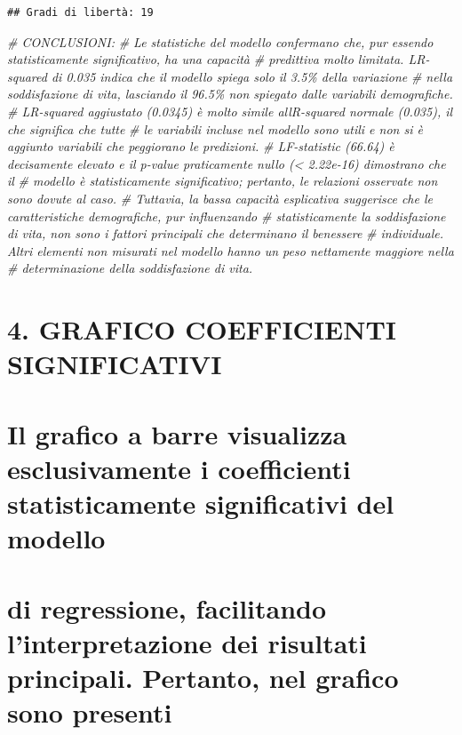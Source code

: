 \documentclass[
]{article}
\newenvironment{Shaded}{\begin{snugshade}}{\end{snugshade}}
\newcommand{\CommentTok}[1]{\textcolor[rgb]{0.56,0.35,0.01}{\textit{#1}}}
\begin{document}
\begin{verbatim}
## Gradi di libertà: 19
\end{verbatim}

\begin{Shaded}
\begin{Highlighting}[]
\CommentTok{\# CONCLUSIONI:}
\CommentTok{\# Le statistiche del modello confermano che, pur essendo statisticamente significativo, ha una capacità}
\CommentTok{\# predittiva molto limitata. L\textquotesingle{}R{-}squared di 0.035 indica che il modello spiega solo il 3.5\% della variazione}
\CommentTok{\# nella soddisfazione di vita, lasciando il 96.5\% non spiegato dalle variabili demografiche.}
\CommentTok{\# L\textquotesingle{}R{-}squared aggiustato (0.0345) è molto simile all\textquotesingle{}R{-}squared normale (0.035), il che significa che tutte }
\CommentTok{\# le variabili incluse nel modello sono utili e non si è aggiunto variabili che peggiorano le predizioni.}
\CommentTok{\# L\textquotesingle{}F{-}statistic (66.64) è decisamente elevato e il p{-}value praticamente nullo (\textless{} 2.22e{-}16) dimostrano che il}
\CommentTok{\# modello è statisticamente significativo; pertanto, le relazioni osservate non sono dovute al caso.}
\CommentTok{\# Tuttavia, la bassa capacità esplicativa suggerisce che le caratteristiche demografiche, pur influenzando}
\CommentTok{\# statisticamente la soddisfazione di vita, non sono i fattori principali che determinano il benessere}
\CommentTok{\# individuale. Altri elementi non misurati nel modello hanno un peso nettamente maggiore nella }
\CommentTok{\# determinazione della soddisfazione di vita.}
\end{Highlighting}
\end{Shaded}

\section{4. GRAFICO COEFFICIENTI
SIGNIFICATIVI}\label{grafico-coefficienti-significativi}

\section{Il grafico a barre visualizza esclusivamente i coefficienti
statisticamente significativi del
modello}\label{il-grafico-a-barre-visualizza-esclusivamente-i-coefficienti-statisticamente-significativi-del-modello}

\section{di regressione, facilitando l'interpretazione dei risultati
principali. Pertanto, nel grafico sono
presenti}\label{di-regressione-facilitando-linterpretazione-dei-risultati-principali.-pertanto-nel-grafico-sono-presenti}
\end{document}
